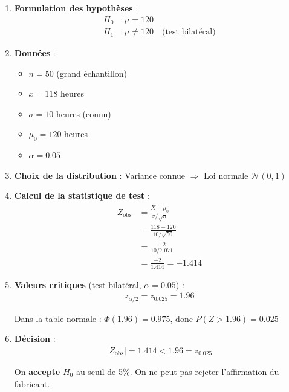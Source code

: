 \documentclass[11pt,a4paper]{article}
\newcommand{\N}{\mathcal{N}}
\begin{document}
\begin{enumerate}
    \item \textbf{Formulation des hypothèses} :
    \begin{align*}
    H_0 &: \mu = 120 \\
    H_1 &: \mu \neq 120 \quad \text{(test bilatéral)}
    \end{align*}
    
    \item \textbf{Données} :
    \begin{itemize}
        \item $n = 50$ (grand échantillon)
        \item $\bar{x} = 118$ heures
        \item $\sigma = 10$ heures (connu)
        \item $\mu_0 = 120$ heures
        \item $\alpha = 0.05$
    \end{itemize}
    
    \item \textbf{Choix de la distribution} : Variance connue $\Rightarrow$ Loi normale $\N(0,1)$
    
    \item \textbf{Calcul de la statistique de test} :
    \begin{align*}
    Z_{\text{obs}} &= \frac{\bar{X} - \mu_0}{\sigma/\sqrt{n}} \\
    &= \frac{118 - 120}{10/\sqrt{50}} \\
    &= \frac{-2}{10/7.071} \\
    &= \frac{-2}{1.414} = -1.414
    \end{align*}
    
    \item \textbf{Valeurs critiques} (test bilatéral, $\alpha = 0.05$) :
    \begin{align*}
    z_{\alpha/2} = z_{0.025} = 1.96
    \end{align*}
    
    Dans la table normale : $\Phi(1.96) = 0.975$, donc $P(Z > 1.96) = 0.025$
    
    \item \textbf{Décision} :
    \begin{align*}
    |Z_{\text{obs}}| = 1.414 < 1.96 = z_{0.025}
    \end{align*}
    
    On \textbf{accepte} $H_0$ au seuil de 5\%. On ne peut pas rejeter l'affirmation du fabricant.
    

\end{enumerate}
\end{document}
